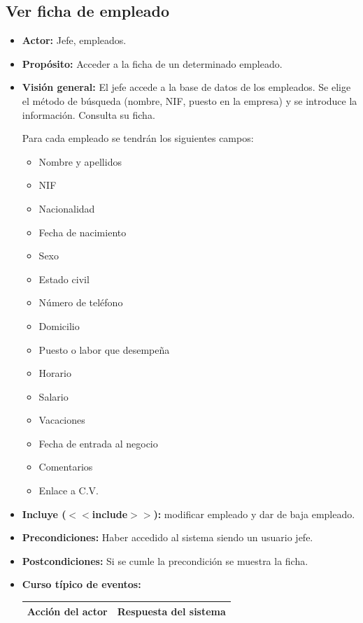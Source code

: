 \documentclass[spanish,a4paper,11pt, twoside]{report}	%
\begin{document}
	\subsection{Ver ficha de empleado}		
			\begin{itemize}
			\item \textbf{Actor:} Jefe, empleados.
			\item \textbf{Propósito: } Acceder a la ficha de un determinado empleado.
			\item \textbf{Visión general:} El jefe accede a la base de datos de los empleados. Se elige el método de búsqueda (nombre, NIF, puesto en la empresa) y se introduce la información. Consulta su ficha.

Para cada empleado se tendrán los siguientes campos:
				\begin{itemize}
				\item 	 Nombre y apellidos
				\item 	 NIF
				\item 	 Nacionalidad
				\item 	Fecha de nacimiento
				\item 	Sexo
				\item 	Estado civil
				\item 	Número de teléfono
				\item 	Domicilio
				\item 	 Puesto o labor que desempeña
				\item 	 Horario
				\item 	 Salario
				\item 	 Vacaciones
				\item 	 Fecha de entrada al negocio
				\item 	 Comentarios
				\item 	Enlace a C.V.
				\end {itemize}
			\item \textbf{Incluye ($<<$include$>>$):} modificar empleado y dar de baja empleado.
			\item \textbf{Precondiciones:} Haber accedido al sistema siendo un usuario jefe.
			\item \textbf{Postcondiciones:} Si se cumle la precondición se muestra la ficha.
			\item \textbf{Curso típico de eventos:} 	\\
				\begin{tabular}{|p{6cm}||p{6cm}|}
				\hline
				\textbf{Acción del actor} & \textbf{Respuesta del sistema} \\ \hline \hline

\end{tabular}
\end{itemize}
\end{document}

